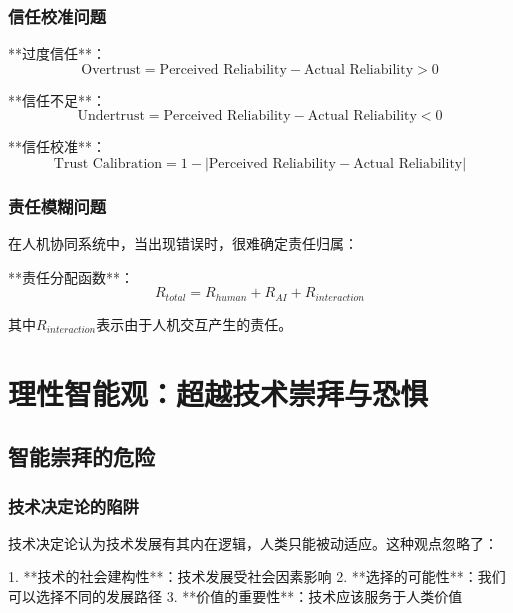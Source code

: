 \subsubsection{信任校准问题}

**过度信任**：
\begin{equation}
\text{Overtrust} = \text{Perceived Reliability} - \text{Actual Reliability} > 0
\end{equation}

**信任不足**：
\begin{equation}
\text{Undertrust} = \text{Perceived Reliability} - \text{Actual Reliability} < 0
\end{equation}

**信任校准**：
\begin{equation}
\text{Trust Calibration} = 1 - |\text{Perceived Reliability} - \text{Actual Reliability}|
\end{equation}

\subsubsection{责任模糊问题}

在人机协同系统中，当出现错误时，很难确定责任归属：

**责任分配函数**：
\begin{equation}
R_{total} = R_{human} + R_{AI} + R_{interaction}
\end{equation}

其中$R_{interaction}$表示由于人机交互产生的责任。

\section{理性智能观：超越技术崇拜与恐惧}

\subsection{智能崇拜的危险}

\subsubsection{技术决定论的陷阱}

技术决定论认为技术发展有其内在逻辑，人类只能被动适应。这种观点忽略了：

1. **技术的社会建构性**：技术发展受社会因素影响
2. **选择的可能性**：我们可以选择不同的发展路径
3. **价值的重要性**：技术应该服务于人类价值

